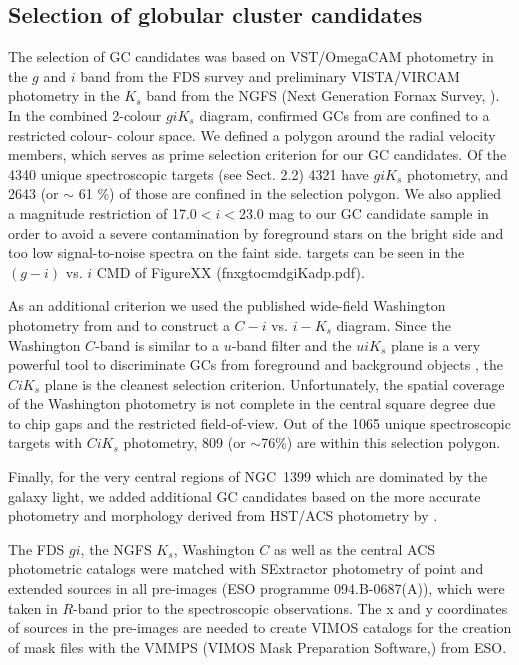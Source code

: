 \subsection{Selection of globular cluster candidates}
\label{sec:selectionGC}
The selection of GC candidates was based on VST/OmegaCAM photometry in the $g$ 
and $i$ band from the FDS survey 
\citep{DAbrusco16,Iodice16} and preliminary VISTA/VIRCAM photometry in the 
$K_s$ band from the NGFS (Next 
Generation Fornax Survey, \citealt{Munoz14}). 
In the combined 2-colour $giK_s$ diagram, confirmed GCs from \citet{Schuberth} 
are confined to a restricted colour-
colour space. 
We defined a polygon around the radial velocity members, which serves as prime 
selection criterion for our GC candidates. 
Of the 4340 unique spectroscopic targets (see Sect. 2.2) 4321 have $giK_s$ 
photometry, and 2643 (or $\sim$ 61 \%) of those are confined in the selection 
polygon. 
We also applied a magnitude restriction of 17.0$<i<$23.0 mag to our GC 
candidate sample in order to avoid a severe contamination by foreground stars 
on the bright side and too low signal-to-noise spectra on the faint side. 
targets can be seen in the $(g-i)$ vs. $i$ CMD of FigureXX 
(fnxgtocmdgiKadp.pdf).

As an additional criterion we used the published wide-field Washington 
photometry from \citet{Dirsch04} and \citet{Bassino} to construct a $C-i$ vs. 
$i-K_s$ diagram. Since the Washington $C$-band is similar to a $u$-band filter 
and the $uiK_s$ plane is a very powerful tool to discriminate GCs from 
foreground and background objects \citep{Munoz14}, the $CiK_s$ plane is the 
cleanest selection criterion. Unfortunately, the spatial coverage of the 
Washington photometry is not complete in the central square degree due to chip 
gaps and the restricted field-of-view. 
Out of the 1065 unique spectroscopic targets with $CiK_s$ photometry, 809 (or 
$\sim$76\%) are within this selection polygon.

Finally, for the very central regions of NGC~1399 which are dominated by the 
galaxy light, we added additional GC candidates based on the more accurate 
photometry and morphology derived from HST/ACS photometry by \citet{Puzia14}.

The FDS $gi$, the NGFS $K_s$, Washington $C$ as well as the central ACS  
photometric catalogs were matched with SExtractor photometry of point and 
extended sources in all pre-images (ESO programme 094.B-0687(A)), which were 
taken in $R$-band prior to the spectroscopic observations. The x and y 
coordinates of sources in the pre-images are needed to create VIMOS catalogs 
for the creation of mask files with the VMMPS (VIMOS Mask Preparation 
Software,\citealt{Bottini05}) from ESO.

